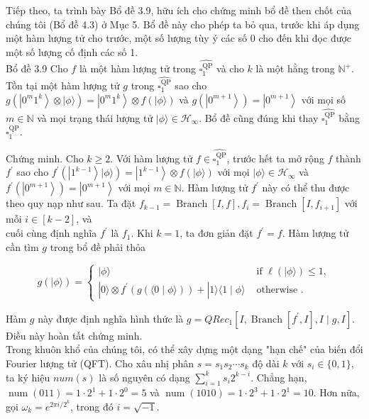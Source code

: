 \documentclass[10pt]{article}
\begin{document}
Tiếp theo, ta trình bày Bổ đề 3.9, hữu ích cho chứng minh bổ đề then chốt của chúng tôi (Bổ đề 4.3) ở Mục 5. Bổ đề này cho phép ta bỏ qua, trước khi áp dụng một hàm lượng tử cho trước, một số lượng tùy ý các số 0 cho đến khi đọc được một số lượng cố định các số 1.\\
Bổ đề 3.9 Cho $f$ là một hàm lượng tử trong $\widehat{\square_{1}^{\mathrm{QP}}}$ và cho $k$ là một hằng trong $\mathbb{N}^{+}$. Tồn tại một hàm lượng tử $g$ trong $\widehat{\square_{1}^{\mathrm{QP}}}$ sao cho $g\left(\left|0^{m} 1^{k}\right\rangle \otimes|\phi\rangle\right)=\left|0^{m} 1^{k}\right\rangle \otimes f(|\phi\rangle)$ và $g\left(\left|0^{m+1}\right\rangle\right)=\left|0^{m+1}\right\rangle$ với mọi số $m \in \mathbb{N}$ và mọi trạng thái lượng tử $|\phi\rangle \in \mathcal{H}_{\infty}$. Bổ đề cũng đúng khi thay $\widehat{\square_{1}^{\mathrm{QP}}}$ bằng $\square_{1}^{\mathrm{QP}}$.

Chứng minh. Cho $k \geq 2$. Với hàm lượng tử $f \in \widehat{\square_{1}^{\mathrm{QP}}}$, trước hết ta mở rộng $f$ thành $f^{\prime}$ sao cho $f^{\prime}\left(\left|1^{k-1}\right\rangle|\phi\rangle\right)= \left|1^{k-1}\right\rangle \otimes f(|\phi\rangle)$ với mọi $|\phi\rangle \in \mathcal{H}_{\infty}$ và $f^{\prime}\left(\left|0^{m+1}\right\rangle\right)=\left|0^{m+1}\right\rangle$ với mọi $m \in \mathbb{N}$. Hàm lượng tử $f^{\prime}$ này có thể thu được theo quy nạp như sau. Ta đặt $f_{k-1}=\operatorname{Branch}[I, f], f_{i}=\operatorname{Branch}\left[I, f_{i+1}\right]$ với mỗi $i \in[k-2]$, và\\
cuối cùng định nghĩa $f^{\prime}$ là $f_{1}$. Khi $k=1$, ta đơn giản đặt $f^{\prime}=f$. Hàm lượng tử cần tìm $g$ trong bổ đề phải thỏa

$$
g(|\phi\rangle)= \begin{cases}|\phi\rangle & \text { if } \ell(|\phi\rangle) \leq 1, \\ |0\rangle \otimes f^{\prime}(g(\langle 0 \mid \phi\rangle))+|1\rangle\langle 1 \mid \phi\rangle & \text { otherwise } .\end{cases}
$$

Hàm $g$ này được định nghĩa hình thức là $g=Q R e c_{1}\left[I, \operatorname{Branch}\left[f^{\prime}, I\right], I \mid g, I\right]$. Điều này hoàn tất chứng minh.\\
Trong khuôn khổ của chúng tôi, có thể xây dựng một dạng "hạn chế" của biến đổi Fourier lượng tử (QFT). Cho xâu nhị phân $s=s_{1} s_{2} \cdots s_{k}$ độ dài $k$ với $s_{i} \in\{0,1\}$, ta ký hiệu $n u m(s)$ là số nguyên có dạng $\sum_{i=1}^{k} s_{i} 2^{k-i}$. Chẳng hạn, $\operatorname{num}(011)=1 \cdot 2^{1}+1 \cdot 2^{0}=5$ và $\operatorname{num}(1010)=1 \cdot 2^{3}+1 \cdot 2^{1}=10$. Hơn nữa, gọi $\omega_{k}=e^{2 \pi i / 2^{k}}$, trong đó $i=\sqrt{-1}$.
\end{document}
